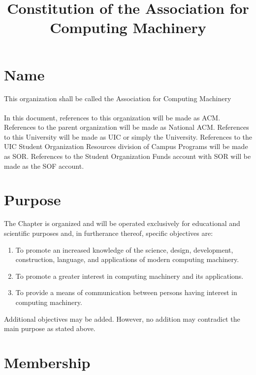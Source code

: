 \documentclass[12pt,titlepage]{article}
\begin{document}
\title{Constitution of the Association for Computing Machinery}
\maketitle

\tableofcontents

\pagebreak

\section{Name}

This organization shall be called the Association for Computing Machinery\\
\\
In this document, references to this organization will be made as ACM. References to the parent organization will be made as National ACM. References to this University will be made as UIC or simply the University. References to the UIC Student Organization Resources division of Campus Programs will be made as SOR. References to the Student Organization Funds account with SOR will be made as the SOF account.

\section{Purpose}

The Chapter is organized and will be operated exclusively for educational and scientific purposes and, in furtherance thereof, specific objectives are:
\begin{enumerate}
\item To promote an increased knowledge of the science, design, development, construction, language, and applications of modern computing machinery.
\item To promote a greater interest in computing machinery and its applications.
\item To provide a means of communication between persons having interest in computing machinery.
\end{enumerate}
Additional objectives may be added. However, no addition may contradict the main purpose as stated above.

\section{Membership}
\end{document}
